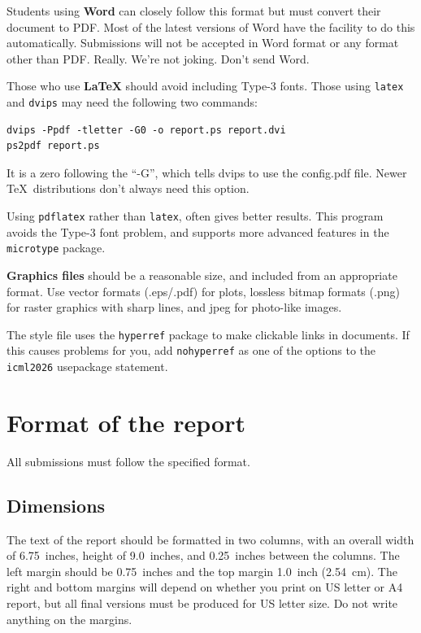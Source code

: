\documentclass{article}
\theoremstyle{plain}
\theoremstyle{definition}
\theoremstyle{remark}
\begin{document}
Students using \textbf{Word} can closely follow this format but must convert their document to PDF\@. Most
of the latest versions of Word have the facility to do this
automatically. Submissions will not be accepted in Word format or any
format other than PDF\@. Really. We're not joking. Don't send Word.

Those who use \textbf{\LaTeX} should avoid including Type-3 fonts.
Those using \texttt{latex} and \texttt{dvips} may need the following
two commands:

{\footnotesize
\begin{verbatim}
dvips -Ppdf -tletter -G0 -o report.ps report.dvi
ps2pdf report.ps
\end{verbatim}}
It is a zero following the ``-G'', which tells dvips to use
the config.pdf file. Newer \TeX\ distributions don't always need this
option.

Using \texttt{pdflatex} rather than \texttt{latex}, often gives better
results. This program avoids the Type-3 font problem, and supports more
advanced features in the \texttt{microtype} package.

\textbf{Graphics files} should be a reasonable size, and included from
an appropriate format. Use vector formats (.eps/.pdf) for plots,
lossless bitmap formats (.png) for raster graphics with sharp lines, and
jpeg for photo-like images.

The style file uses the \texttt{hyperref} package to make clickable
links in documents. If this causes problems for you, add
\texttt{nohyperref} as one of the options to the \texttt{icml2026}
usepackage statement.

\section{Format of the report}

All submissions must follow the specified format.

\subsection{Dimensions}

The text of the report should be formatted in two columns, with an
overall width of 6.75~inches, height of 9.0~inches, and 0.25~inches
between the columns. The left margin should be 0.75~inches and the top
margin 1.0~inch (2.54~cm). The right and bottom margins will depend on
whether you print on US letter or A4 report, but all final versions
must be produced for US letter size.
Do not write anything on the margins.
\end{document}

